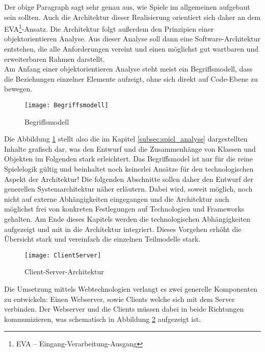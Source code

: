 Der obige Paragraph sagt sehr genau aus, wie Spiele im allgemeinen aufgebaut sein sollten. Auch die Architektur dieser Realisierung orientiert sich daher an dem EVA\footnote{EVA -- Eingang-Verarbeitung-Ausgang}-Ansatz. 
Die Architektur folgt außerdem den Prinzipien einer objektorientieren Analyse. Aus dieser Analyse soll dann eine Software-Architektur entstehen, die alle Anforderungen vereint und einen möglichst gut wartbaren und erweiterbaren Rahmen darstellt.\\
Am Anfang einer objektorientieren Analyse steht meist ein Begriffsmodell, dass die Beziehungen einzelner Elemente aufzeigt, ohne sich direkt auf Code-Ebene zu bewegen. 
\begin{figure}[h]
	\centering
	\captionsetup{justification=centering}
	\texttt{[image: Begriffsmodell]}
	\caption[Begriffsmodell]{Begriffsmodell}
	\label{fig:Begriffsmodell}
\end{figure}
Die Abbildung \ref{fig:Begriffsmodell} stellt also die im Kapitel \ref{subsec:spiel_analyse} dargestellten Inhalte grafisch dar, was den Entwurf und die Zusammenhänge von Klassen und Objekten im Folgenden stark erleichtert. Das Begriffsmodel ist nur für die reine Spielelogik gültig und beinhaltet noch keinerlei Ansätze für den technologischen Aspekt der Architektur! Die folgenden Abschnitte sollen daher den Entwurf der generellen Systemarchitektur näher erläutern. Dabei wird, soweit möglich, noch nicht auf externe Abhängigkeiten eingegangen und die Architektur auch möglichst frei von konkreten Festlegungen auf Technologien und Frameworks gehalten. Am Ende dieses Kapitels werden die technologischen Abhängigkeiten aufgezeigt und mit in die Architektur integriert. Dieses Vorgehen erhöht die Übersicht stark und vereinfach die einzelnen Teilmodelle stark.

\begin{figure}[htp]
	\centering
	\captionsetup{justification=centering}
	\texttt{[image: ClientServer]}
	\caption[Client-Server-Architektur]{Client-Server-Architektur}
	\label{fig:Client-Server-Architektur}
\end{figure}
Die Umsetzung mittels Webtechnologien verlangt es zwei generelle Komponenten zu entwickeln: Einen Webserver, sowie Clients welche sich mit dem Server verbinden.
Der Webserver und die Clients müssen dabei in beide Richtungen kommunizieren, was schematisch in Abbildung \ref{fig:Client-Server-Architektur} aufgezeigt ist.

